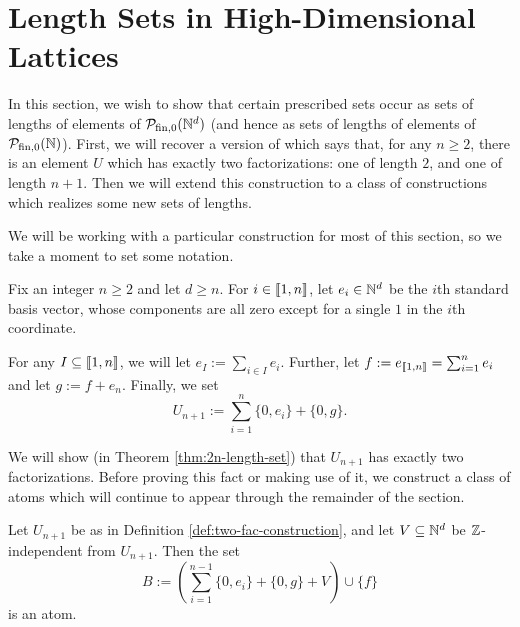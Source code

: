 \section{Length Sets in High-Dimensional Lattices}
In this section, we wish to show that certain prescribed sets occur as sets of lengths of elements of $\mathcal{P}_{\textrm{fin}, 0}(\mathbb{N}^d)$ (and hence as sets of lengths of elements of ${\mathcal{P}_{\textrm{fin},0}(\mathbb{N})}$).
First, we will recover a version of \cite[Proposition 4.10]{fan-tringali18} which says that, for any $n\ge 2$, there is an element $U$ which has exactly two factorizations: one of length $2$, and one of length $n+1$.
Then we will extend this construction to a class of constructions which realizes some new sets of lengths.

We will be working with a particular construction for most of this section, so we take a moment to set some notation.

\begin{defn} \label{def:two-fac-construction}
Fix an integer $n\ge 2$ and let $d\ge n$.
For $i\in \llbracket 1,n\rrbracket$, let $e_i \in \mathbb{N}^d$ be the $i$th standard basis vector, whose components are all zero except for a single $1$ in the $i$th coordinate.

For any $I \subseteq \llbracket 1,n \rrbracket$, we will let $e_I := \sum_{i\in I} e_i$.
Further, let $f := e_{\llbracket 1,n \rrbracket} = \sum_{i=1}^n e_i$ and let $g := f + e_n$.
Finally, we set
\[U_{n+1} := \sum_{i=1}^n \{0,e_i\} + \{0,g\}.\]
\end{defn}

We will show (in Theorem \ref{thm:2n-length-set}) that $U_{n+1}$ has exactly two factorizations. 
Before proving this fact or making use of it, we construct a class of atoms which will continue to appear through the remainder of the section.

\begin{lemma} \label{lem:large-atom-two-fac}
Let $U_{n+1}$ be as in Definition \ref{def:two-fac-construction}, and let $V\subseteq \mathbb{N}^d$ be $\mathbb{Z}$-independent from $U_{n+1}$.
Then the set
\[ B:= \left( \sum_{i=1}^{n-1} \{0,e_i\} + \{0,g\} + V \right) \cup \{f\} \]
is an atom.
\end{lemma}

